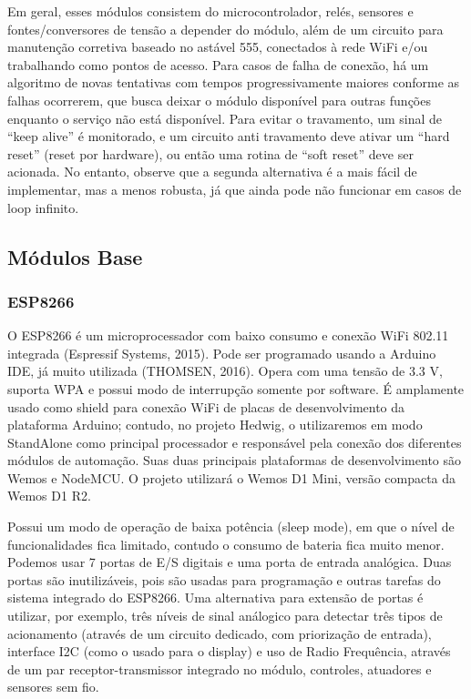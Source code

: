 Em geral, esses módulos consistem do microcontrolador, relés, sensores e fontes/conversores de tensão a depender do módulo, além de um circuito para manutenção corretiva baseado no astável 555, conectados à rede WiFi e/ou trabalhando como pontos de acesso. Para casos de falha de conexão, há um algoritmo de novas tentativas com tempos progressivamente maiores conforme as falhas ocorrerem, que busca deixar o módulo disponível para outras funções enquanto o serviço não está disponível. Para evitar o travamento, um sinal de “keep alive” é monitorado, e um circuito anti travamento deve ativar um “hard reset” (reset por hardware), ou então uma rotina de “soft reset” deve ser acionada. No entanto, observe que a segunda alternativa é a mais fácil de implementar, mas a menos robusta, já que ainda pode não funcionar em casos de loop infinito.

\subsection{Módulos Base}
\subsubsection{ESP8266}
O ESP8266 é um microprocessador com baixo consumo e conexão WiFi 802.11 integrada (Espressif Systems, 2015). Pode ser programado usando a Arduino IDE, já muito utilizada (THOMSEN, 2016). Opera com uma tensão de 3.3 V, suporta WPA e possui modo de interrupção somente por software. É amplamente usado como shield para conexão WiFi de placas de desenvolvimento da plataforma Arduino; contudo, no projeto Hedwig, o utilizaremos em modo StandAlone como principal processador e responsável pela conexão dos diferentes módulos de automação. Suas duas principais plataformas de desenvolvimento são Wemos e NodeMCU. O projeto utilizará o Wemos D1 Mini, versão compacta da Wemos D1 R2.

Possui um modo de operação de baixa potência (sleep mode), em que o nível de funcionalidades fica limitado, contudo o consumo de bateria fica muito menor. Podemos usar 7 portas de E/S digitais e uma porta de entrada analógica. Duas portas são inutilizáveis, pois são usadas para programação e outras tarefas do sistema integrado do ESP8266. Uma alternativa para extensão de portas é utilizar, por exemplo, três níveis de sinal análogico para detectar três tipos de acionamento (através de um circuito dedicado, com priorização de entrada), interface I2C (como o usado para o display) e uso de Radio Frequência, através de um par receptor-transmissor integrado no módulo, controles, atuadores e sensores sem fio.

